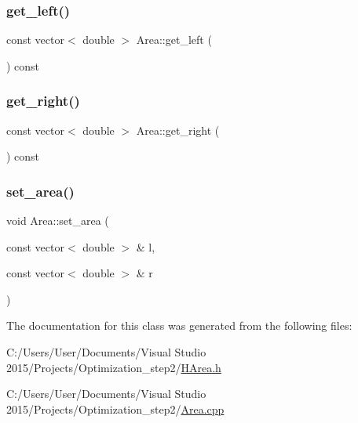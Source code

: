 \subsubsection{\texorpdfstring{get\+\_\+left()}{get\_left()}}
{\footnotesize\ttfamily const vector$<$ double $>$ Area\+::get\+\_\+left (\begin{DoxyParamCaption}{ }\end{DoxyParamCaption}) const}

\mbox{\label{class_area_a4bdaf9dc0d21b0798d068e759c77a134}} 
\subsubsection{\texorpdfstring{get\+\_\+right()}{get\_right()}}
{\footnotesize\ttfamily const vector$<$ double $>$ Area\+::get\+\_\+right (\begin{DoxyParamCaption}{ }\end{DoxyParamCaption}) const}

\mbox{\label{class_area_a0ba2b25e1d74f7e64d433f0c8318d497}} 
\subsubsection{\texorpdfstring{set\+\_\+area()}{set\_area()}}
{\footnotesize\ttfamily void Area\+::set\+\_\+area (\begin{DoxyParamCaption}\item[{const vector$<$ double $>$ \&}]{l,  }\item[{const vector$<$ double $>$ \&}]{r }\end{DoxyParamCaption})}



The documentation for this class was generated from the following files\+:\begin{DoxyCompactItemize}
\item 
C\+:/\+Users/\+User/\+Documents/\+Visual Studio 2015/\+Projects/\+Optimization\+\_\+step2/\hyperlink{_h_area_8h}{H\+Area.\+h}\item 
C\+:/\+Users/\+User/\+Documents/\+Visual Studio 2015/\+Projects/\+Optimization\+\_\+step2/\hyperlink{_area_8cpp}{Area.\+cpp}\end{DoxyCompactItemize}
